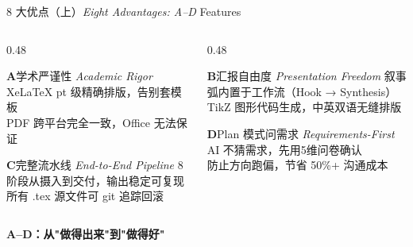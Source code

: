 \documentclass[aspectratio=169,10pt]{beamer}
\newcommand{\EN}[1]{\textit{#1}}
\newcommand{\sectag}[1]{\textmd{\small\normalfont\textcolor{deepblue!60}{#1}}}
\newcommand{\cluetag}[1]{\begin{center}\footnotesize\textcolor{accent}{\textbf{#1}}\end{center}}
\begin{document}
\begin{frame}[t,shrink=3]{8 大优点（上）\EN{Eight Advantages: A--D} \sectag{Features}}
  \begin{columns}[T]
    \begin{column}{0.48\textwidth}
      \begin{block}{\textcolor{deepblue}{\large\bfseries A}\quad 学术严谨性 \EN{Academic Rigor}}
        \footnotesize
        XeLaTeX pt 级精确排版，告别套模板\\
        PDF 跨平台完全一致，Office 无法保证
      \end{block}
      \vspace{6pt}
      \begin{block}{\textcolor{deepblue}{\large\bfseries C}\quad 完整流水线 \EN{End-to-End Pipeline}}
        \footnotesize
        8 阶段从摄入到交付，输出稳定可复现\\
        所有 .tex 源文件可 git 追踪回滚
      \end{block}
    \end{column}
    \begin{column}{0.48\textwidth}
      \begin{block}{\textcolor{deepblue}{\large\bfseries B}\quad 汇报自由度 \EN{Presentation Freedom}}
        \footnotesize
        叙事弧内置于工作流（Hook → Synthesis）\\
        TikZ 图形代码生成，中英双语无缝排版
      \end{block}
      \vspace{6pt}
      \begin{alertblock}{\textcolor{accent}{\large\bfseries D}\quad Plan 模式问需求 \EN{Requirements-First}}
        \footnotesize
        AI 不猜需求，先用5维问卷确认\\
        防止方向跑偏，节省 50\%+ 沟通成本
      \end{alertblock}
    \end{column}
  \end{columns}
  \vspace{4pt}
  \cluetag{A--D：从"做得出来"到"做得好"}
\end{frame}
\end{document}
